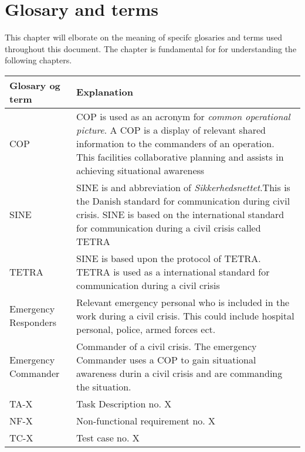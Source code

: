 \label{chp_revisionHistory}
\chapter{Glosary and terms}

This chapter will elborate on the meaning of specifc glosaries and terms used throughout this document. The chapter is fundamental for for understanding the following chapters.

\begin{longtable}{| p{3.5cm} |  p{10cm} | }
	\hline
	\textbf{Glosary og term} &  \textbf{Explanation } \\
	\hline
	COP & COP is used as an acronym for \emph{common operational picture}. A COP is a display of relevant shared information to the commanders of an operation. This facilities collaborative planning and assists in achieving situational awareness \\
	\hline
	SINE & SINE is and abbreviation of \emph{Sikkerhedsnettet}.This is the Danish standard for communication during civil crisis. SINE is based on the international standard for communication during a civil crisis called TETRA\\
	\hline
	TETRA & SINE is based upon the protocol of TETRA. TETRA is used as a international standard for communication during a civil crisis  \\
	\hline
	Emergency Responders & Relevant emergency personal who is included in the work during a civil crisis. This could include hospital personal, police, armed forces ect.  \\
	\hline
	Emergency Commander & Commander of a civil crisis. The emergency Commander uses a COP to gain situational awareness durin a civil crisis and are commanding the situation.  \\
	\hline
	TA-X & Task Description no. X \\
	\hline
	NF-X & Non-functional requirement no. X \\
	\hline
	TC-X & Test case no. X \\
	\hline
\end{longtable}